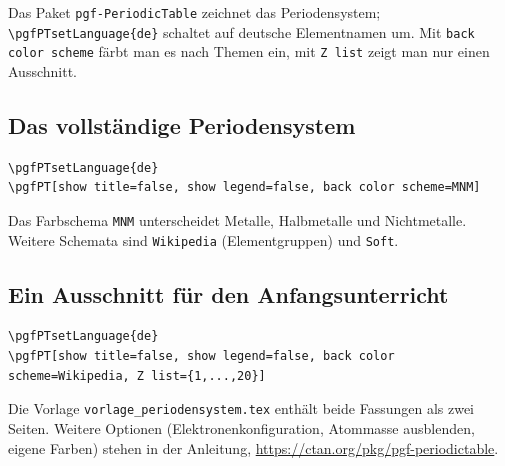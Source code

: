Das Paket \texttt{pgf-PeriodicTable} zeichnet das Periodensystem; \texttt{\textbackslash pgfPTsetLanguage\{de\}} schaltet auf deutsche Elementnamen um. Mit \texttt{back color scheme} färbt man es nach Themen ein, mit \texttt{Z list} zeigt man nur einen Ausschnitt.


\subsection{Das vollständige Periodensystem}

\begin{lstlisting}[style=latex]
\pgfPTsetLanguage{de}
\pgfPT[show title=false, show legend=false, back color scheme=MNM]
\end{lstlisting}

\begin{ausgabe}
	\centering
	\begin{passend}%
	\pgfPT[show title=false, show legend=false, back color scheme=MNM]%
	\end{passend}
\end{ausgabe}

Das Farbschema \texttt{MNM} unterscheidet Metalle, Halbmetalle und Nichtmetalle. Weitere Schemata sind \texttt{Wikipedia} (Elementgruppen) und \texttt{Soft}.


\subsection{Ein Ausschnitt für den Anfangsunterricht}

\begin{lstlisting}[style=latex]
\pgfPTsetLanguage{de}
\pgfPT[show title=false, show legend=false, back color scheme=Wikipedia, Z list={1,...,20}]
\end{lstlisting}

\begin{ausgabe}
	\pgfPTsetLanguage{de}
	\centering
	\begin{passend}%
	\pgfPT[show title=false, show legend=false, back color scheme=Wikipedia, Z list={1,...,20}]%
	\end{passend}
\end{ausgabe}

Die Vorlage \texttt{vorlage\_periodensystem.tex} enthält beide Fassungen als zwei Seiten. Weitere Optionen (Elektronenkonfiguration, Atommasse ausblenden, eigene Farben) stehen in der Anleitung, \url{https://ctan.org/pkg/pgf-periodictable}.



